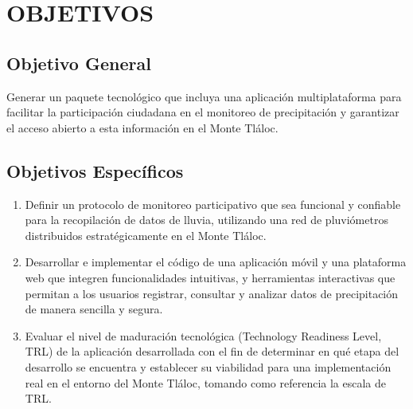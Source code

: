 \chapter{OBJETIVOS}
\section{Objetivo General}

Generar un paquete tecnológico que incluya una aplicación multiplataforma para facilitar la participación ciudadana en el monitoreo de precipitación y garantizar el acceso abierto a esta información en el Monte Tláloc.

\section{Objetivos Específicos}

\begin{enumerate}
    \item Definir un protocolo de monitoreo participativo que sea funcional y confiable para la recopilación de datos de lluvia, utilizando una red de pluviómetros distribuidos estratégicamente en el Monte Tláloc.
    \item Desarrollar e implementar el código de una aplicación móvil y una plataforma web que integren funcionalidades intuitivas, y herramientas interactivas que permitan a los usuarios registrar, consultar y analizar datos de precipitación de
    manera sencilla y segura.
    \item Evaluar el nivel de maduración tecnológica (Technology Readiness Level, TRL) de la aplicación desarrollada con el fin de determinar en qué etapa del desarrollo se encuentra y establecer su viabilidad para una implementación real en el entorno del Monte Tláloc, tomando como referencia la escala de TRL.
\end{enumerate}